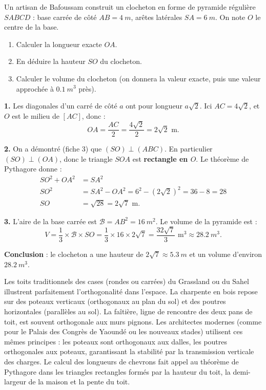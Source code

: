 \documentclass[11pt]{article}
\begin{document}
\begin{exoresolu}
Un artisan de Bafoussam construit un clocheton en forme de pyramide régulière $SABCD$ : base carrée de côté $AB = \SI{4}{m}$, arêtes latérales $SA = \SI{6}{m}$. On note $O$ le centre de la base.
\begin{enumerate}
\item Calculer la longueur exacte $OA$.
\item En déduire la hauteur $SO$ du clocheton.
\item Calculer le volume du clocheton (on donnera la valeur exacte, puis une valeur approchée à $\SI{0,1}{m^3}$ près).
\end{enumerate}
\tcblower
\textbf{1.} Les diagonales d'un carré de côté $a$ ont pour longueur $a\sqrt{2}$. Ici $AC = 4\sqrt{2}$, et $O$ est le milieu de $[AC]$, donc :
\[ OA = \frac{AC}{2} = \frac{4\sqrt{2}}{2} = 2\sqrt{2} \text{ m}. \]

\medskip
\textbf{2.} On a démontré (fiche 3) que $(SO) \perp (ABC)$. En particulier $(SO) \perp (OA)$, donc le triangle $SOA$ est \textbf{rectangle en $O$}. Le théorème de Pythagore donne :
\begin{align*}
SO^2 + OA^2 &= SA^2 \\
SO^2 &= SA^2 - OA^2 = 6^2 - (2\sqrt{2})^2 = 36 - 8 = 28 \\
SO &= \sqrt{28} = 2\sqrt{7} \text{ m}.
\end{align*}

\medskip
\textbf{3.} L'aire de la base carrée est $\mathcal{B} = AB^2 = \SI{16}{m^2}$. Le volume de la pyramide est :
\[ V = \frac{1}{3} \times \mathcal{B} \times SO = \frac{1}{3} \times 16 \times 2\sqrt{7} = \frac{32\sqrt{7}}{3} \text{ m}^3 \approx \SI{28,2}{m^3}. \]

\textbf{Conclusion} : le clocheton a une hauteur de $2\sqrt{7} \approx \SI{5,3}{m}$ et un volume d'environ $\SI{28,2}{m^3}$.
\end{exoresolu}

\begin{savaistu}
Les toits traditionnels des cases (rondes ou carrées) du Grassland ou du Sahel illustrent parfaitement l'orthogonalité dans l'espace. La charpente en bois repose sur des poteaux verticaux (orthogonaux au plan du sol) et des poutres horizontales (parallèles au sol). La faîtière, ligne de rencontre des deux pans de toit, est souvent orthogonale aux murs pignons. Les architectes modernes (comme pour le Palais des Congrès de Yaoundé ou les nouveaux stades) utilisent ces mêmes principes : les poteaux sont orthogonaux aux dalles, les poutres orthogonales aux poteaux, garantissant la stabilité par la transmission verticale des charges. Le calcul des longueurs de chevrons fait appel au théorème de Pythagore dans les triangles rectangles formés par la hauteur du toit, la demi-largeur de la maison et la pente du toit.
\end{savaistu}
\end{document}
